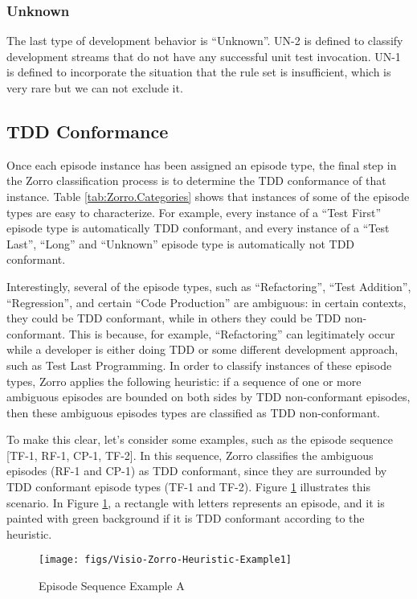 \subsubsection{Unknown}
The last type of development behavior is ``Unknown''.
UN-2 is defined to classify development streams that do not have
any successful unit test invocation. UN-1 is defined to incorporate 
the situation that the rule set is insufficient, which is very rare but 
we can not exclude it. 

\subsection{TDD Conformance}
\label{sec:Zorro-TDDConformance}
Once each episode instance has been assigned an episode type, the final 
step in the Zorro classification process is to determine the TDD 
conformance of that instance. Table \ref{tab:Zorro.Categories} shows 
that instances of some of the episode types are easy to characterize. 
For example, every instance of a ``Test First'' episode type is automatically 
TDD conformant, and every instance of a ``Test Last'', ``Long'' and 
``Unknown'' episode type is automatically not TDD conformant.

Interestingly, several of the episode types, such as ``Refactoring'', ``Test
Addition'', ``Regression'', and certain ``Code Production'' are ambiguous: in
certain contexts, they could be TDD conformant, while in others they could
be TDD non-conformant. This is because, for example, ``Refactoring'' can
legitimately occur while a developer is either doing TDD or some different 
development approach, such as Test Last Programming.  In
order to classify instances of these episode types, Zorro applies the
following heuristic: if a sequence of one or more ambiguous episodes are
bounded on both sides by TDD non-conformant episodes, then these ambiguous
episodes types are classified as TDD non-conformant.

To make this clear, let's consider some examples, such as the episode
sequence [TF-1, RF-1, CP-1, TF-2]. In this sequence, Zorro 
classifies the ambiguous episodes (RF-1 and CP-1) as TDD conformant, 
since they are surrounded by TDD conformant episode types (TF-1 and TF-2). 
Figure \ref{fig:Zorro-EpisodeSequence-ExampleA} illustrates this scenario.  
In Figure \ref{fig:Zorro-EpisodeSequence-ExampleA}, a rectangle with 
letters represents an episode, and it is painted with green background 
if it is TDD conformant according to the heuristic. 
\begin{figure}[htbp]
  \centering
  \texttt{[image: figs/Visio-Zorro-Heuristic-Example1]}
  \caption{Episode Sequence Example A}
  \label{fig:Zorro-EpisodeSequence-ExampleA}
\end{figure}

